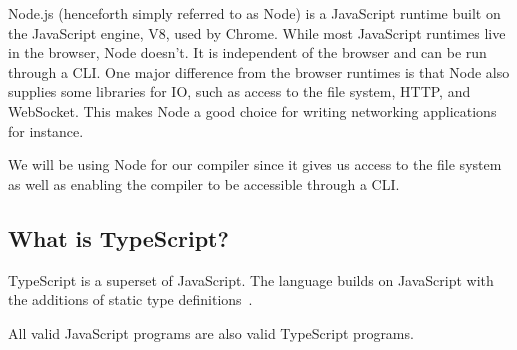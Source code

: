 Node.js (henceforth simply referred to as Node) is a JavaScript runtime built on the JavaScript engine, V8, used by Chrome.
While most JavaScript runtimes live in the browser, Node doesn't.
It is independent of the browser and can be run through a CLI.
One major difference from the browser runtimes is that Node also supplies some libraries for IO, such as access to the file system, HTTP, and WebSocket.
This makes Node a good choice for writing networking applications for instance.

We will be using Node for our compiler since it gives us access to the file system as well as enabling the compiler to be accessible through a CLI.

\subsection{What is TypeScript?}\label{subsec:what-is-typescript}

TypeScript is a superset of JavaScript.
The language builds on JavaScript with the additions of static type definitions~\cite{tswebsite}.

All valid JavaScript programs are also valid TypeScript programs.
